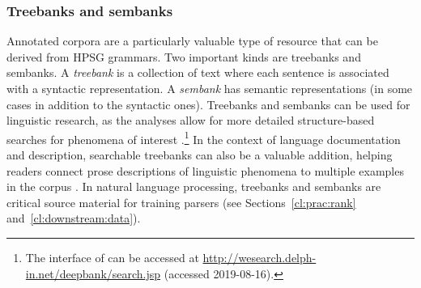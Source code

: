 \documentclass[output=paper,biblatex,babelshorthands,newtxmath,draftmode,colorlinks,citecolor=brown]{langscibook}
\begin{document}
\subsubsection{Treebanks and sembanks}
\label{cl:lang-doc:treebanks}

% 
Annotated corpora are a particularly valuable type of resource that
can be derived from HPSG grammars.  Two important kinds are treebanks and sembanks.  A
\textit{treebank} is a collection of text where each sentence is associated with a syntactic
representation.  A \textit{sembank} has semantic representations (in some cases in addition to the
syntactic ones). Treebanks and sembanks can be used for linguistic research, as the analyses allow
for more detailed structure-based searches for phenomena of
interest \citep{Rohde:05,Gho:Bir:10,Kou:Oep:14}.\footnote{The  interface of
  \citet{Kou:Oep:14} can be accessed at \url{http://wesearch.delph-in.net/deepbank/search.jsp}
  (accessed 2019-08-16).}  In the context of language documentation and description, searchable
treebanks can also be a valuable addition, helping readers connect prose
descriptions of linguistic phenomena to multiple examples in the corpus
\citep{Ben:Gho:Bal:Dri:12}. In natural language processing, treebanks and sembanks are critical
source material for training parsers (see Sections~\ref{cl:prac:rank} and~\ref{cl:downstream:data}).
\end{document}
